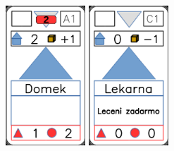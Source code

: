 \documentclass[a4paper]{article}
\begin{document}
	\includegraphics[width=3.0cm]{img-3_0}
	\includegraphics[width=3.0cm]{img-3_10}
\end{document}
